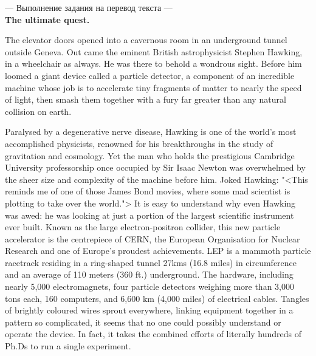 \documentclass[main.tex]{subfiles}
\begin{document}


--- Выполнение задания на перевод текста ---
\\

\textbf{The ultimate quest.}

The elevator doors opened into a cavernous room in an underground tunnel outside Geneva.
Out came the eminent British astrophysicist Stephen Hawking, in a wheelchair as always.
He was there to behold a wondrous sight.
Before him loomed a giant device called a particle detector, a component of an incredible machine whose job is to accelerate tiny fragments of matter to nearly the speed of light, then smash them together with a fury far greater than any natural collision on earth.

Paralysed by a degenerative nerve disease, Hawking is one of the world's most accomplished physicists, renowned for his breakthroughs in the study of gravitation and cosmology.
Yet the man who holds the prestigious Cambridge University professorship once occupied by Sir Isaac Newton was overwhelmed by the sheer size and complexity of the machine before him.
Joked Hawking: "<This reminds me of one of those James Bond movies, where some mad scientist is plotting to take over the world.">
It is easy to understand why even Hawking was awed: he was looking at just a portion of the largest scientific instrument ever built.
Known as the large electron-positron collider, this new particle accelerator is the centrepiece of CERN, the European Organisation for Nuclear Research and one of Europe's proudest achievements.
LEP is a mammoth particle racetrack residing in a ring-shaped tunnel 27kms (16.8 miles) in circumference and an average of 110 meters (360 ft.) underground.
The hardware, including nearly 5,000 electromagnets, four particle detectors weighing more than 3,000 tons each, 160 computers, and 6,600 km (4,000 miles) of electrical cables.
Tangles of brightly coloured wires sprout everywhere, linking equipment together in a pattern so complicated, it seems that no one could possibly understand or operate the device.
In fact, it takes the combined efforts of literally hundreds of Ph.Ds to run a single experiment.
\end{document}
